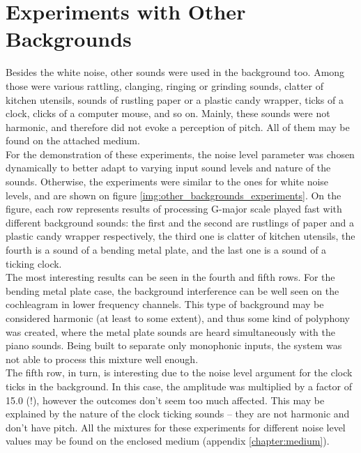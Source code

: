\section{Experiments with Other Backgrounds}

Besides the white noise, other sounds were used in the background too. Among those were various rattling, clanging, ringing or grinding sounds, clatter of kitchen utensils, sounds of rustling paper or a plastic candy wrapper, ticks of a clock, clicks of a computer mouse, and so on. Mainly, these sounds were not harmonic, and therefore did not evoke a perception of pitch. All of them may be found on the attached medium.\\

For the demonstration of these experiments, the noise level parameter was chosen dynami\-cally to better adapt to varying input sound levels and nature of the sounds. Otherwise, the experiments were similar to the ones for white noise levels, and are shown on figure \ref{img:other_backgrounds_experiments}. On the figure, each row represents results of processing G-major scale played fast with different background sounds: the first and the second are rustlings of paper and a plastic candy wrapper respectively, the third one is clatter of kitchen utensils, the fourth is a sound of a bending metal plate, and the last one is a sound of a ticking clock.\\

The most interesting results can be seen in the fourth and fifth rows. For the bending metal plate case, the background interference can be well seen on the cochleagram in lower frequency channels. This type of background may be considered harmonic (at least to some extent), and thus some kind of polyphony was created, where the metal plate sounds are heard simultaneously with the piano sounds. Being built to separate only monophonic inputs, the system was not able to process this mixture well enough.\\

The fifth row, in turn, is interesting due to the noise level argument for the clock ticks in the background. In this case, the amplitude was multiplied by a factor of 15.0 (!), however the outcomes don't seem too much affected. This may be explained by the nature of the clock ticking sounds -- they are not harmonic and don't have pitch. All the mixtures for these experiments for different noise level values may be found on the enclosed medium (appendix \ref{chapter:medium}).

